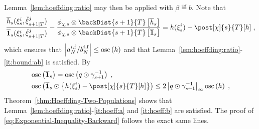 Lemma~\ref{lem:hoeffding:ratio} may then be applied with $\beta \eqdef b$. Note that
\[
\frac{\fup{h}{s}(\epart{s}{i},\ebackpart{s+1}{T}{j})}{\fup{\1}{s}(\epart{s}{i},\ebackpart{s+1}{T}{j})}-\frac{\filt{\Xinit,s}\otimes\backDist{s+1}{T}\left[\fup{h}{s}\right]}{\filt{\Xinit,s}\otimes\backDist{s+1}{T}\left[\fup{\1}{s}\right]} =  h(\epart{s}{i}) -  \post[\Xinit]{s}{T}[h]\eqsp,
\]
which ensures that $\left |a_N^{i, \mathrm{f}}/b_N^{i, \mathrm{f}}\right|\le \oscnorm{h}$ and that Lemma~\ref{lem:hoeffding:ratio}-\eqref{it:bound:ab} is satisfied. By
\begin{align*}
&\oscnorm{\fup{\1}{s}} = \oscnorm{ q\odot \gamma_{s+1}^{-1}}\eqsp,\\
&\oscnorm{\fup{\1}{s}\odot\left\{h(\epart{s}{i}) -  \post[\Xinit]{s}{T}[h]\right\}} \le 2 \esssup{q\odot \gamma_{s+1}^{-1}}\oscnorm{h}\eqsp,
\end{align*}
Theorem~\ref{thm:Hoeffding-Two-Populations} shows that Lemma~\ref{lem:hoeffding:ratio}-\eqref{it:hoeff:a} and \eqref{it:hoeff:b} are satisfied. The proof of \eqref{eq:Exponential-Inequality-Backward} follows the exact same lines.

